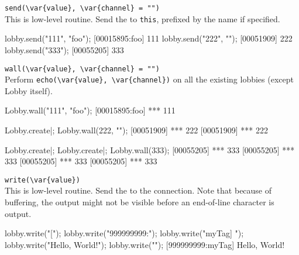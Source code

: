 \begin{urbiscriptapi}
\item \lstinline|send(\var{value}, \var{channel} = "")|\\
  This is low-level routine.  Send the  
  to \lstinline|this|, prefixed by the 
   name if specified.
\begin{urbiscript}
lobby.send("111", "foo");
[00015895:foo] 111
lobby.send("222", "");
[00051909] 222
lobby.send("333");
[00055205] 333
\end{urbiscript}

\item \lstinline|wall(\var{value}, \var{channel} = "")|\\
  Perform \lstinline|echo(\var{value}, \var{channel})| on all the
  existing lobbies (except Lobby itself).
\begin{urbiscript}[firstnumber=1]
Lobby.wall("111", "foo");
[00015895:foo] *** 111

Lobby.create|;
Lobby.wall(222, "");
[00051909] *** 222
[00051909] *** 222

Lobby.create|;
Lobby.create|;
Lobby.wall(333);
[00055205] *** 333
[00055205] *** 333
[00055205] *** 333
[00055205] *** 333
\end{urbiscript}

\item \lstinline|write(\var{value})|\\
  This is low-level routine.  Send the  
  to the connection.  Note that because of buffering, the output might
  not be visible before an end-of-line character is output.
\begin{urbiscript}
lobby.write("[");
lobby.write("999999999:");
lobby.write("myTag] ");
lobby.write("Hello, World!");
lobby.write("\n");
[999999999:myTag] Hello, World!
\end{urbiscript}
\end{urbiscriptapi}

